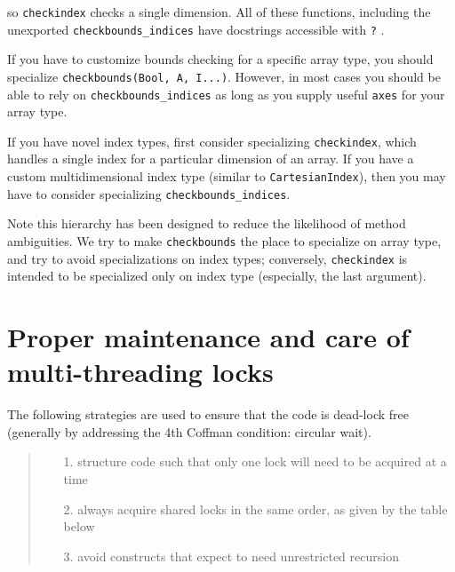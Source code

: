 so \texttt{checkindex} checks a single dimension.  All of these functions, including the unexported \texttt{checkbounds\_indices} have docstrings accessible with \texttt{?} .



If you have to customize bounds checking for a specific array type, you should specialize \texttt{checkbounds(Bool, A, I...)}. However, in most cases you should be able to rely on \texttt{checkbounds\_indices} as long as you supply useful \texttt{axes} for your array type.



If you have novel index types, first consider specializing \texttt{checkindex}, which handles a single index for a particular dimension of an array.  If you have a custom multidimensional index type (similar to \texttt{CartesianIndex}), then you may have to consider specializing \texttt{checkbounds\_indices}.



Note this hierarchy has been designed to reduce the likelihood of method ambiguities.  We try to make \texttt{checkbounds} the place to specialize on array type, and try to avoid specializations on index types; conversely, \texttt{checkindex} is intended to be specialized only on index type (especially, the last argument).



\hypertarget{17038639605096915302}{}


\section{Proper maintenance and care of multi-threading locks}



The following strategies are used to ensure that the code is dead-lock free (generally by addressing the 4th Coffman condition: circular wait).



\begin{quote}
\begin{itemize}
\item[1. ] structure code such that only one lock will need to be acquired at a time


\item[2. ] always acquire shared locks in the same order, as given by the table below


\item[3. ] avoid constructs that expect to need unrestricted recursion

\end{itemize}
\end{quote}


